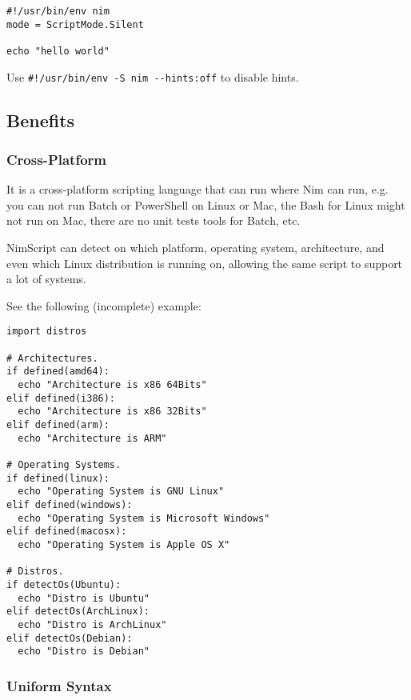 \begin{verbatim}
#!/usr/bin/env nim
mode = ScriptMode.Silent

echo "hello world"
\end{verbatim}

Use \texttt{\#!/usr/bin/env\ -S\ nim\ -\/-hints:off} to disable hints.

\hypertarget{benefits}{%
\subsection{Benefits}\label{benefits}}

\hypertarget{cross-platform}{%
\subsubsection{Cross-Platform}\label{cross-platform}}

It is a cross-platform scripting language that can run where Nim can
run, e.g. you can not run Batch or PowerShell on Linux or Mac, the Bash
for Linux might not run on Mac, there are no unit tests tools for Batch,
etc.

NimScript can detect on which platform, operating system, architecture,
and even which Linux distribution is running on, allowing the same
script to support a lot of systems.

See the following (incomplete) example:

\begin{verbatim}
import distros

# Architectures.
if defined(amd64):
  echo "Architecture is x86 64Bits"
elif defined(i386):
  echo "Architecture is x86 32Bits"
elif defined(arm):
  echo "Architecture is ARM"

# Operating Systems.
if defined(linux):
  echo "Operating System is GNU Linux"
elif defined(windows):
  echo "Operating System is Microsoft Windows"
elif defined(macosx):
  echo "Operating System is Apple OS X"

# Distros.
if detectOs(Ubuntu):
  echo "Distro is Ubuntu"
elif detectOs(ArchLinux):
  echo "Distro is ArchLinux"
elif detectOs(Debian):
  echo "Distro is Debian"
\end{verbatim}

\hypertarget{uniform-syntax}{%
\subsubsection{Uniform Syntax}\label{uniform-syntax}}

